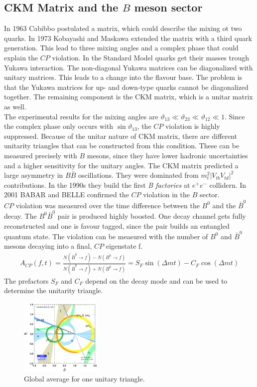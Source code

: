 \subsection{CKM Matrix and the $B$ meson sector}
In 1963 Cabibbo postulated a matrix, which could describe the mixing ot two quarks. In 1973 Kobayashi and Maskawa extended the matrix with a third quark generation. This lead to three mixing angles and a complex phase that could explain the $CP$ violation. In the Standard Model quarks get their masses trough Yukawa interaction. The non-diagonal Yukawa matrices can be diagonalized with unitary matrices. This leads to a change into the flavour base. The problem is that the Yukawa matrices for up- and down-type quarks cannot be diagonalized together. The remaining component is the CKM matrix, which is a unitar matrix as well.\\
The experimental results for the mixing angles are $\vartheta_{13} \ll \vartheta_{23} \ll \vartheta_{12} \ll 1$. Since the complex phase only occurs with $\sin\vartheta_{13}$, the $CP$ violation is highly suppressed. Because of the unitar nature of CKM matrix, there are different unitarity triangles that can be constructed from this condition. These can be measured precisely with $B$ mesons, since they have lower hadronic uncertainties and a higher sensitivity for the unitary angles. The CKM matrix predicted a large asymmetry in $B\bar{B}$ oscillations. They were dominated from $m_t^2|V_{tb}V_{td}|^2$ contributions. In the 1990s they build the first \textit{B factories} at $e^+e^-$ collidern. In 2001 BABAR and BELLE confirmed the $CP$ violation in the $B$ sector.\\
$CP$ violation was measured over the time difference between the $B^0$ and the $\bar{B}^0$ decay. The $B^0\bar{B}^0$ pair is produced highly boosted. One decay channel gets fully reconstructed and one is favour tagged, since the pair builds an entangled quantum state. The violation can be measured with the number of $B^0$ and $\bar{B}^0$ mesons decaying into a final, $CP$ eigenstate f.
\begin{align*}
	A_{CP}(f,t) = \frac{N(\bar{B}^0 \rightarrow f) - N(B^0 \rightarrow f)} {N(\bar{B}^0 \rightarrow f) + N(B^0 \rightarrow f)} = S_F \sin(\Delta m t) -C_F \cos(\Delta m t)
\end{align*}
The prefactors $S_F$ and $C_F$ depend on the decay mode and can be used to determine the unitarity triangle.
\begin{figure}
	\center
  \includegraphics[width=0.35\textwidth]{graphics/CKM.png}
  \caption{Global average for one unitary triangle. \cite{Kaonen}}
	\label{fig:CKM}
\end{figure}
